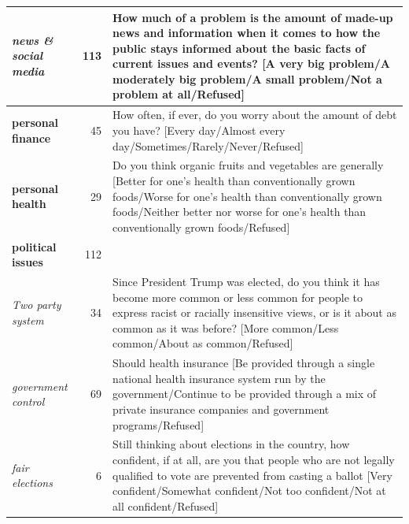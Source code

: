 \begin{table}[!h]
\begin{center}
\begin{small}
\begin{tabular}{lrp{10cm}}
            \textit{news \& social media} &   113 & How much of a problem is the amount of made-up news and information when it comes to how the public stays informed about the basic facts of current issues and events? [A very big problem/A moderately big problem/A small problem/Not a problem at all/Refused] \\ \hline
            \textbf{personal finance} &    45 & How often, if ever, do you worry about the amount of debt you have? [Every day/Almost every day/Sometimes/Rarely/Never/Refused] \\ \hline
            \textbf{personal health} &    29 & Do you think organic fruits and vegetables are generally [Better for one's health than conventionally grown foods/Worse for one's health than conventionally grown foods/Neither better nor worse for one's health than conventionally grown foods/Refused] \\       \hline
            \textbf{political issues} &   112 &  \\ 
            \textit{Two party system} &   34 &  Since President Trump was elected, do you think it has become more common or less common for people to express racist or racially insensitive views, or is it about as common as it was before? [More common/Less common/About as common/Refused] \\ 
            \textit{government control} &   69 &  Should health insurance [Be provided through a single national health insurance system run by the government/Continue to be provided through a mix of private insurance companies and government programs/Refused] \\
            \textit{fair elections} &   6 &  Still thinking about elections in the country, how confident, if at all, are you that people who are not legally qualified to vote are prevented from casting a ballot [Very confident/Somewhat confident/Not too confident/Not at all confident/Refused] \\       \bottomrule
        \end{tabular}
\end{small}
\end{center}    
\vskip -0.1in
\end{table}

